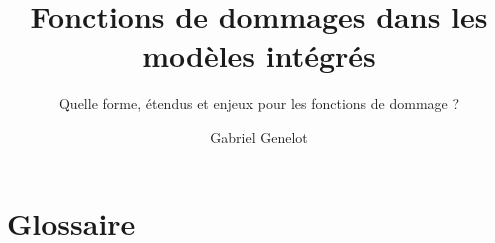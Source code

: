 \documentclass{layout/epfl-report}
\begin{document}





\frontmatter

\title{Fonctions de dommages dans les modèles intégrés}
\subtitle{Quelle forme, étendus et enjeux pour les fonctions de dommage ?}
\author{Gabriel Genelot}

\subject{\textit{Mémoire de recherche}} %
\affiliation{} %

\makecover



%

\tableofcontents



%


\mainmatter











\setcounter{biburlnumpenalty}{7000}
\setcounter{biburllcpenalty}{7000}
\setcounter{biburlucpenalty}{7000}




\appendix

\renewcommand{\chaptername}{Annexe}
\newrefsegment


\chapter{Glossaire}
\begin{multicols}{2}
    \printglossary[title=]
\end{multicols}
\end{document}
